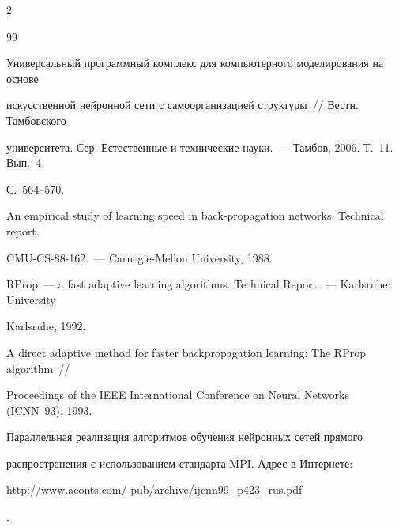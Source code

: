\begin{multicols}{2}
{{\begin{thebibliography}{99}




Универсальный программный комплекс для компьютерного моделирования на основе


искусственной нейронной сети с самоорганизацией структуры~// Вестн. Тамбовского


университета. Сер. Естественные и технические науки.~--- Тамбов, 2006. Т.~11. Вып.~4.


С.~564--570.









An empirical study of learning speed in back-propagation networks. Technical report.


CMU-CS-88-162.~--- Carnegie-Mellon University, 1988.









RProp~--- a fast adaptive learning algorithms. Technical Report.~--- Karlsruhe: University


Karlsruhe, 1992.









A direct adaptive method for faster backpropagation learning: The RProp algorithm~//


Proceedings of the IEEE International Conference on Neural Networks (ICNN~93), 1993.









Параллельная реализация алгоритмов обучения нейронных сетей прямого


распространения с использованием стандарта MPI. Адрес в Интернете: {\sf


http://www.aconts.com/ pub/archive/ijcnn99\_p423\_rus.pdf}.










\end{thebibliography}}}
\end{multicols}
